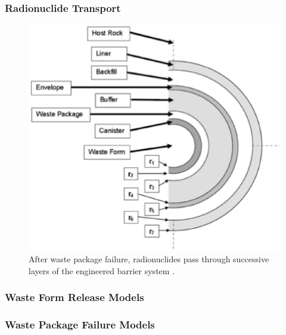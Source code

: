 

\begin{frame}[ctb!]
  \frametitle{Radionuclide Transport}
  \begin{figure}[h!]
    \begin{center}
      \includegraphics[height=0.7\textheight]{ebsLayersLLNL.eps}
    \end{center}
    \caption{After waste package failure, radionuclides pass through successive 
    layers of the engineered barrier system \cite{greenberg_thermal_2011}.}
    \label{fig:ebsLayersLLNL}
  \end{figure}
\end{frame}


\begin{frame}[ctb!]
  \frametitle{Waste Form Release Models}
  \footnotesize{}
\end{frame}

\begin{frame}[ctb!]
  \frametitle{Waste Package Failure Models}
  \footnotesize{
  
  }
\end{frame}


